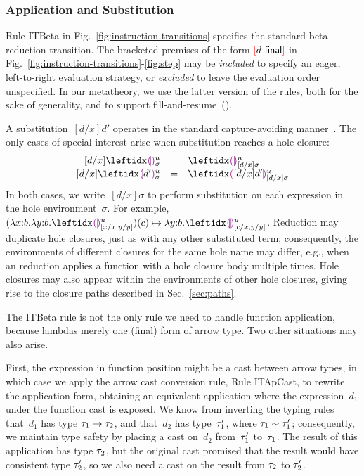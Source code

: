 
\subsubsection{Application and Substitution} 
%
Rule {ITBeta} in Fig.~\ref{fig:instruction-transitions} specifies the
standard beta reduction transition.
%
The bracketed premises of the form ${\textcolor{red}[}d~\mathsf{final}{\textcolor{red}]}$ in
Fig.~\ref{fig:instruction-transitions}-\ref{fig:step} may be \emph{included}
to specify an eager, left-to-right evaluation strategy, or \emph{excluded} to
leave the evaluation order unspecified.
%
In our metatheory, we use the latter version of the rules, both for
the sake of generality, and to support fill-and-resume~().

A substitution~$[d/x]d'$ operates in the standard capture-avoiding manner~\cite{pfpl}. 
%
The only cases of special interest arise when substitution reaches a hole closure:
\[
\begin{array}{rcl}
  [d/x]\dehole{u}{\sigma}{} & = & \dehole{u}{[d/x]\sigma}{} \\%
  \substitute{d}{x}{\dhole{d'}{u}{\sigma}{}} & = & \dhole{[d/x]d'}{u}{[d/x]\sigma}{}
\end{array}
\]
In both cases, we write~$[d/x]\sigma$ to perform substitution on each expression in the hole environment~$\sigma$. 
%
For example, $\stepsToD{}
    {\hap{(\halam{x}{b}{\halam{y}{b}{\dehole{u}{[x/x, y/y]}{}}})}{c}}
    {\halam{y}{b}{\dehole{u}{[c/x, y/y]}{}}}$. 
%
Reduction may duplicate hole closures, just as with any other substituted term;
%
consequently, the environments of different closures for the same hole name may differ, 
e.g., when an reduction applies a function with a hole closure body multiple times.%
%
Hole closures may also appear within the environments of other hole
closures, giving rise to the closure paths described in
Sec.~\ref{sec:paths}.

The ITBeta rule is not the only rule we need to handle function
application, because lambdas merely one (final) form of arrow type.
%
Two other situations may also arise.

First, the expression in function position might be a cast between
arrow types, in which case we apply the arrow cast conversion rule,
Rule {ITApCast}, to rewrite the application form, obtaining an
equivalent application where the expression~$d_1$ under the function
cast is exposed.
%
We know from inverting the typing rules that~$d_1$ has type
$\tau_1 \rightarrow \tau_2$, and that~$d_2$ has type~$\tau_1'$, where
$\tau_1 \sim \tau_1'$; consequently, we maintain type
safety by placing a cast on~$d_2$ from~$\tau_1'$ to~$\tau_1$.
%
The result of this application has type $\tau_2$, but the
original cast promised that the result would have consistent type
$\tau_2'$, so we also need a cast on the result from $\tau_2$ to
$\tau_2'$.

